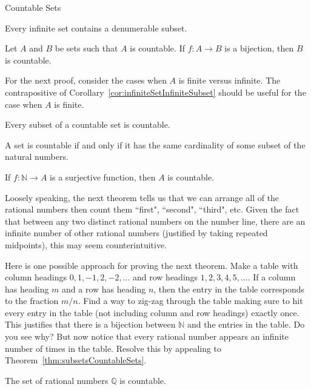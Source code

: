 \begin{section}{Countable Sets}
\begin{theorem}
Every infinite set contains a denumerable subset.
\end{theorem}

\begin{theorem}
Let $A$ and $B$ be sets such that $A$ is countable. If $f:A\to B$ is a bijection, then $B$ is countable.
\end{theorem}

For the next proof, consider the cases when $A$ is finite versus infinite. The contrapositive of Corollary~\ref{cor:infiniteSetInfiniteSubset} should be useful for the case when $A$ is finite.

\begin{theorem}\label{thm:subsetsCountableSets}
Every subset of a countable set is countable.
\end{theorem}

\begin{theorem}
A set is countable if and only if it has the same cardinality of some subset of the natural numbers.
\end{theorem}

\begin{theorem}
If $f:\mathbb{N}\to A$ is a surjective function, then $A$ is countable.
\end{theorem}

Loosely speaking, the next theorem tells us that we can arrange all of the rational numbers then count them ``first", ``second", ``third", etc. Given the fact that between any two distinct rational numbers on the number line, there are an infinite number of other rational numbers (justified by taking repeated midpoints), this may seem counterintuitive.  

Here is one possible approach for proving the next theorem. Make a table with column headings $0, 1, -1, 2,-2,\ldots$ and row headings $1,2,3,4,5,\ldots$.  If a column has heading $m$ and a row has heading $n$, then the entry in the table corresponds to the fraction $m/n$.  Find a way to zig-zag through the table making sure to hit every entry in the table (not including column and row headings) exactly once.  This justifies that there is a bijection between $\mathbb{N}$ and the entries in the table.  Do you see why?  But now notice that every rational number appears an infinite number of times in the table. Resolve this by appealing to Theorem~\ref{thm:subsetsCountableSets}.

\begin{theorem}
The set of rational numbers $\mathbb{Q}$ is countable.
\end{theorem}


\end{section}
